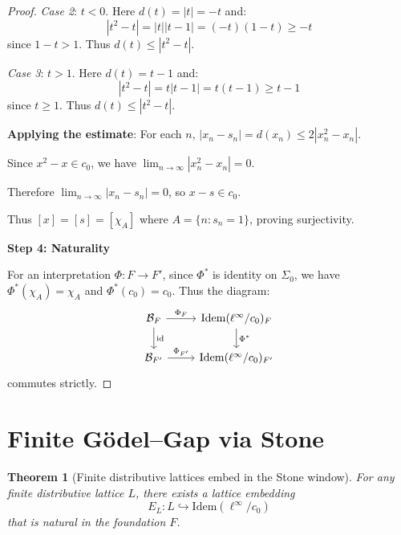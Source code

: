 \documentclass[11pt]{article}
\newtheorem{theorem}{Theorem}[section]
\theoremstyle{definition}
\theoremstyle{remark}
\newcommand{\cnull}{c_0}
\newcommand{\linf}{\ell^\infty}
\begin{document}
\begin{proof}
\emph{Case 2}: \(t < 0\). Here \(d(t) = |t| = -t\) and:
\[|t^2 - t| = |t||t - 1| = (-t)(1 - t) \geq -t\]
since \(1 - t > 1\). Thus \(d(t) \leq |t^2 - t|\).

\emph{Case 3}: \(t > 1\). Here \(d(t) = t - 1\) and:
\[|t^2 - t| = t|t - 1| = t(t - 1) \geq t - 1\]
since \(t \geq 1\). Thus \(d(t) \leq |t^2 - t|\).

\textbf{Applying the estimate}: For each \(n\), \(|x_n - s_n| = d(x_n) \leq 2|x_n^2 - x_n|\).

Since \(x^2 - x \in \cnull\), we have \(\lim_{n \to \infty} |x_n^2 - x_n| = 0\).

Therefore \(\lim_{n \to \infty} |x_n - s_n| = 0\), so \(x - s \in \cnull\).

Thus \([x] = [s] = [\chi_A]\) where \(A = \{n : s_n = 1\}\), proving surjectivity.

\textbf{Step 4: Naturality}

For an interpretation \(\Phi: F \to F'\), since \(\Phi^*\) is identity on \(\Sigma_0\), we have \(\Phi^*(\chi_A) = \chi_A\) and \(\Phi^*(\cnull) = \cnull\). Thus the diagram:
\[\begin{tikzcd}
\mathcal B_F \arrow[r, "\Phi_F"] \arrow[d, "\text{id}"] & \mathrm{Idem}(\linf/\cnull)_F \arrow[d, "\Phi^*"] \\
\mathcal B_{F'} \arrow[r, "\Phi_{F'}"] & \mathrm{Idem}(\linf/\cnull)_{F'}
\end{tikzcd}\]
commutes strictly.
\end{proof}

\section{Finite Gödel--Gap via Stone}\label{sec:finite-godel}

\begin{theorem}[Finite distributive lattices embed in the Stone window]\label{thm:finite-embed}
For any finite distributive lattice \(L\), there exists a lattice embedding
\[
 E_L: L \hookrightarrow \mathrm{Idem}(\linf/\cnull)
\]
that is natural in the foundation \(F\).
\end{theorem}
\end{document}
